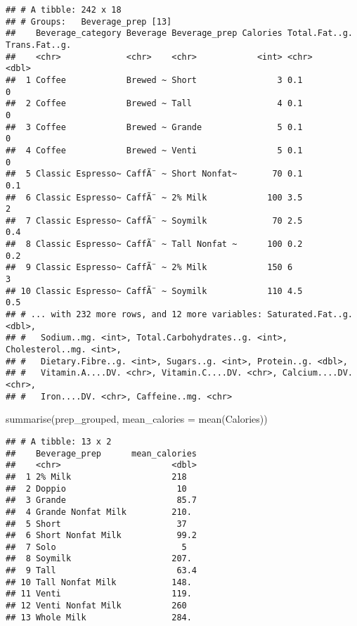 \documentclass[
]{article}
\newenvironment{Shaded}{\begin{snugshade}}{\end{snugshade}}
\newcommand{\AttributeTok}[1]{\textcolor[rgb]{0.77,0.63,0.00}{#1}}
\newcommand{\FunctionTok}[1]{\textcolor[rgb]{0.00,0.00,0.00}{#1}}
\newcommand{\NormalTok}[1]{#1}
\begin{document}
\begin{verbatim}
## # A tibble: 242 x 18
## # Groups:   Beverage_prep [13]
##    Beverage_category Beverage Beverage_prep Calories Total.Fat..g. Trans.Fat..g.
##    <chr>             <chr>    <chr>            <int> <chr>                 <dbl>
##  1 Coffee            Brewed ~ Short                3 0.1                     0  
##  2 Coffee            Brewed ~ Tall                 4 0.1                     0  
##  3 Coffee            Brewed ~ Grande               5 0.1                     0  
##  4 Coffee            Brewed ~ Venti                5 0.1                     0  
##  5 Classic Espresso~ CaffÃ¨ ~ Short Nonfat~       70 0.1                     0.1
##  6 Classic Espresso~ CaffÃ¨ ~ 2% Milk            100 3.5                     2  
##  7 Classic Espresso~ CaffÃ¨ ~ Soymilk             70 2.5                     0.4
##  8 Classic Espresso~ CaffÃ¨ ~ Tall Nonfat ~      100 0.2                     0.2
##  9 Classic Espresso~ CaffÃ¨ ~ 2% Milk            150 6                       3  
## 10 Classic Espresso~ CaffÃ¨ ~ Soymilk            110 4.5                     0.5
## # ... with 232 more rows, and 12 more variables: Saturated.Fat..g. <dbl>,
## #   Sodium..mg. <int>, Total.Carbohydrates..g. <int>, Cholesterol..mg. <int>,
## #   Dietary.Fibre..g. <int>, Sugars..g. <int>, Protein..g. <dbl>,
## #   Vitamin.A....DV. <chr>, Vitamin.C....DV. <chr>, Calcium....DV. <chr>,
## #   Iron....DV. <chr>, Caffeine..mg. <chr>
\end{verbatim}

\begin{Shaded}
\begin{Highlighting}[]
\FunctionTok{summarise}\NormalTok{(prep\_grouped, }\AttributeTok{mean\_calories =} \FunctionTok{mean}\NormalTok{(Calories))}
\end{Highlighting}
\end{Shaded}

\begin{verbatim}
## # A tibble: 13 x 2
##    Beverage_prep      mean_calories
##    <chr>                      <dbl>
##  1 2% Milk                    218  
##  2 Doppio                      10  
##  3 Grande                      85.7
##  4 Grande Nonfat Milk         210. 
##  5 Short                       37  
##  6 Short Nonfat Milk           99.2
##  7 Solo                         5  
##  8 Soymilk                    207. 
##  9 Tall                        63.4
## 10 Tall Nonfat Milk           148. 
## 11 Venti                      119. 
## 12 Venti Nonfat Milk          260  
## 13 Whole Milk                 284.
\end{verbatim}
\end{document}

